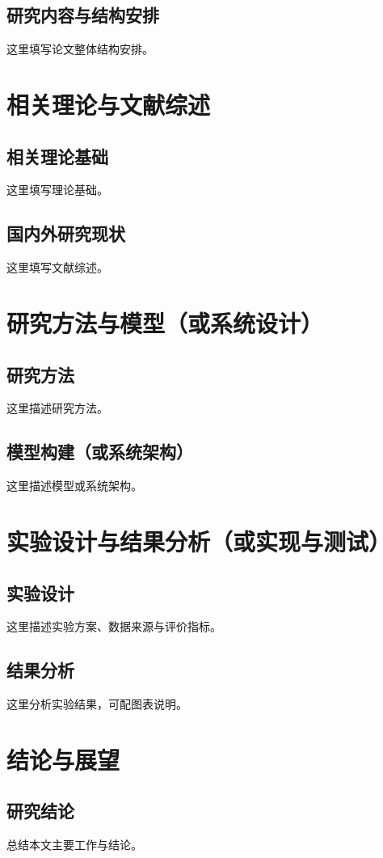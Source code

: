 \documentclass[12pt,a4paper]{ctexrep}
\begin{document}
\section{研究内容与结构安排}
这里填写论文整体结构安排。

\chapter{相关理论与文献综述}
\section{相关理论基础}
这里填写理论基础。

\section{国内外研究现状}
这里填写文献综述。

\chapter{研究方法与模型（或系统设计）}
\section{研究方法}
这里描述研究方法。

\section{模型构建（或系统架构）}
这里描述模型或系统架构。

\chapter{实验设计与结果分析（或实现与测试）}
\section{实验设计}
这里描述实验方案、数据来源与评价指标。

\section{结果分析}
这里分析实验结果，可配图表说明。

\chapter{结论与展望}
\section{研究结论}
总结本文主要工作与结论。
\end{document}
